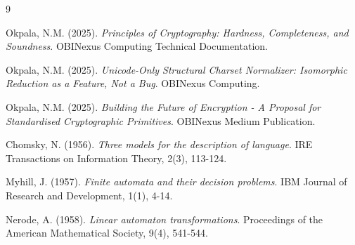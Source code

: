 \documentclass[11pt,a4paper]{article}
\begin{document}

\begin{thebibliography}{9}

Okpala, N.M. (2025).
\textit{Principles of Cryptography: Hardness, Completeness, and Soundness}.
OBINexus Computing Technical Documentation.

Okpala, N.M. (2025).
\textit{Unicode-Only Structural Charset Normalizer: Isomorphic Reduction as a Feature, Not a Bug}.
OBINexus Computing.

Okpala, N.M. (2025).
\textit{Building the Future of Encryption - A Proposal for Standardised Cryptographic Primitives}.
OBINexus Medium Publication.

Chomsky, N. (1956).
\textit{Three models for the description of language}.
IRE Transactions on Information Theory, 2(3), 113-124.

Myhill, J. (1957).
\textit{Finite automata and their decision problems}.
IBM Journal of Research and Development, 1(1), 4-14.

Nerode, A. (1958).
\textit{Linear automaton transformations}.
Proceedings of the American Mathematical Society, 9(4), 541-544.

\end{thebibliography}
\end{document}
